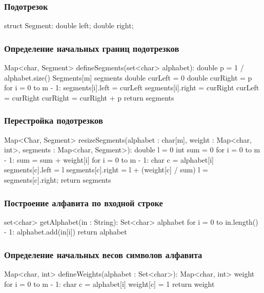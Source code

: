 \documentclass[12pt]{article}
\begin{document}
\subsubsection*{Подотрезок}
\begin{listing}{1}
struct Segment:
    double left;
    double right;
\end{listing}


\subsubsection*{Определение начальных границ подотрезков}
\begin{listing}{1}
Map<char, Segment> defineSegments(set<char> alphabet):
    double p = 1 / alphabet.size()
    Segments[m] segments
    double curLeft = 0
    double curRight = p
    for i = 0 to m - 1:
        segments[i].left = curLeft
        segments[i].right = curRight
        curLeft = curRight
        curRight = curRight + p
    return segments
\end{listing}
\subsubsection*{Перестройка подотрезков}
\begin{listing}{1}
Map<Char, Segment> resizeSegments(alphabet : char[m], weight : 
Map<char, int>, segments : Map<char, Segment>):
    double l = 0
    int sum = 0
    for i = 0 to m - 1:
        sum = sum + weight[i]
    for i = 0 to m - 1:
        char c = alphabet[i]
        segments[c].left = l
        segments[c].right = l + (weight[c] / sum)
        l = segments[c].right;
    return segments
\end{listing}

\subsubsection*{Построение алфавита по входной строке}
\begin{listing}{1}
set<char> getAlphabet(in : String):
    Set<char> alphabet
    for i = 0 to in.length() - 1:
        alphabet.add(in[i])
    return alphabet
\end{listing}

\subsubsection*{Определение начальных весов символов алфавита}
\begin{listing}{1}
Map<char, int> defineWeights(alphabet : Set<char>):
    Map<char, int> weight
    for i = 0 to m - 1:
        char c = alphabet[i]
        weight[c] = 1
    return weight
\end{listing}
\end{document}
